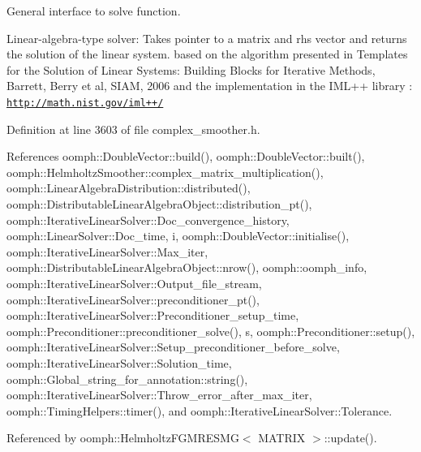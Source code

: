 General interface to solve function. 

Linear-\/algebra-\/type solver\+: Takes pointer to a matrix and rhs vector and returns the solution of the linear system. based on the algorithm presented in Templates for the Solution of Linear Systems\+: Building Blocks for Iterative Methods, Barrett, Berry et al, S\+I\+AM, 2006 and the implementation in the I\+M\+L++ library \+: \href{http://math.nist.gov/iml++/}{\tt http\+://math.\+nist.\+gov/iml++/} 

Definition at line 3603 of file complex\+\_\+smoother.\+h.



References oomph\+::\+Double\+Vector\+::build(), oomph\+::\+Double\+Vector\+::built(), oomph\+::\+Helmholtz\+Smoother\+::complex\+\_\+matrix\+\_\+multiplication(), oomph\+::\+Linear\+Algebra\+Distribution\+::distributed(), oomph\+::\+Distributable\+Linear\+Algebra\+Object\+::distribution\+\_\+pt(), oomph\+::\+Iterative\+Linear\+Solver\+::\+Doc\+\_\+convergence\+\_\+history, oomph\+::\+Linear\+Solver\+::\+Doc\+\_\+time, i, oomph\+::\+Double\+Vector\+::initialise(), oomph\+::\+Iterative\+Linear\+Solver\+::\+Max\+\_\+iter, oomph\+::\+Distributable\+Linear\+Algebra\+Object\+::nrow(), oomph\+::oomph\+\_\+info, oomph\+::\+Iterative\+Linear\+Solver\+::\+Output\+\_\+file\+\_\+stream, oomph\+::\+Iterative\+Linear\+Solver\+::preconditioner\+\_\+pt(), oomph\+::\+Iterative\+Linear\+Solver\+::\+Preconditioner\+\_\+setup\+\_\+time, oomph\+::\+Preconditioner\+::preconditioner\+\_\+solve(), s, oomph\+::\+Preconditioner\+::setup(), oomph\+::\+Iterative\+Linear\+Solver\+::\+Setup\+\_\+preconditioner\+\_\+before\+\_\+solve, oomph\+::\+Iterative\+Linear\+Solver\+::\+Solution\+\_\+time, oomph\+::\+Global\+\_\+string\+\_\+for\+\_\+annotation\+::string(), oomph\+::\+Iterative\+Linear\+Solver\+::\+Throw\+\_\+error\+\_\+after\+\_\+max\+\_\+iter, oomph\+::\+Timing\+Helpers\+::timer(), and oomph\+::\+Iterative\+Linear\+Solver\+::\+Tolerance.



Referenced by oomph\+::\+Helmholtz\+F\+G\+M\+R\+E\+S\+M\+G$<$ M\+A\+T\+R\+I\+X $>$\+::update().

\mbox{\label{classoomph_1_1HelmholtzFGMRESMG_ac6e87c2d59dcee71ce599dcbabae5445}} 
